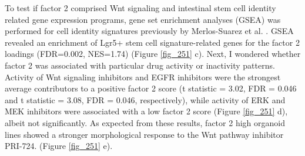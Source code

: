 \begin{flushleft}
To test if factor 2 comprised Wnt signaling and intestinal stem cell identity related gene expression programs, gene set enrichment analyses (GSEA) was performed for cell identity signatures previously by Merlos-Suarez et al. \cite{Merlos-Suarez2011-gd}. GSEA revealed an enrichment of Lgr5+ stem cell signature-related genes for the factor 2 loadings (FDR=0.002, NES=1.74) (Figure \ref{fig_251} c). Next, I wondered whether factor 2 was associated with particular drug activity or inactivity patterns. Activity of Wnt signaling inhibitors and EGFR inhibitors were the strongest average contributors to a positive factor 2 score (t statistic = 3.02, FDR = 0.046 and t statistic = 3.08, FDR = 0.046, respectively), while activity of ERK and MEK inhibitors were associated with a low factor 2 score (Figure \ref{fig_251} d), albeit not significantly. As expected from these results, factor 2 high organoid lines showed a stronger morphological response to the Wnt pathway inhibitor PRI-724. (Figure \ref{fig_251} e).


\end{flushleft}
